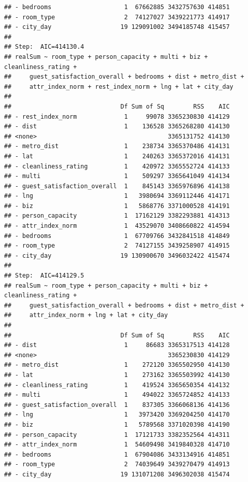\documentclass[
]{article}
\begin{document}
\begin{verbatim}
## - bedrooms                    1  67662885 3432757630 414851
## - room_type                   2  74127027 3439221773 414917
## - city_day                   19 129091002 3494185748 415457
## 
## Step:  AIC=414130.4
## realSum ~ room_type + person_capacity + multi + biz + cleanliness_rating + 
##     guest_satisfaction_overall + bedrooms + dist + metro_dist + 
##     attr_index_norm + rest_index_norm + lng + lat + city_day
## 
##                              Df Sum of Sq        RSS    AIC
## - rest_index_norm             1     99078 3365230830 414129
## - dist                        1    136528 3365268280 414130
## <none>                                    3365131752 414130
## - metro_dist                  1    238734 3365370486 414131
## - lat                         1    240263 3365372016 414131
## - cleanliness_rating          1    420972 3365552724 414133
## - multi                       1    509297 3365641049 414134
## - guest_satisfaction_overall  1    845143 3365976896 414138
## - lng                         1   3980694 3369112446 414171
## - biz                         1   5868776 3371000528 414191
## - person_capacity             1  17162129 3382293881 414313
## - attr_index_norm             1  43529070 3408660822 414594
## - bedrooms                    1  67709766 3432841518 414849
## - room_type                   2  74127155 3439258907 414915
## - city_day                   19 130900670 3496032422 415474
## 
## Step:  AIC=414129.5
## realSum ~ room_type + person_capacity + multi + biz + cleanliness_rating + 
##     guest_satisfaction_overall + bedrooms + dist + metro_dist + 
##     attr_index_norm + lng + lat + city_day
## 
##                              Df Sum of Sq        RSS    AIC
## - dist                        1     86683 3365317513 414128
## <none>                                    3365230830 414129
## - metro_dist                  1    272120 3365502950 414130
## - lat                         1    273162 3365503992 414130
## - cleanliness_rating          1    419524 3365650354 414132
## - multi                       1    494022 3365724852 414133
## - guest_satisfaction_overall  1    837305 3366068136 414136
## - lng                         1   3973420 3369204250 414170
## - biz                         1   5789568 3371020398 414190
## - person_capacity             1  17121733 3382352564 414311
## - attr_index_norm             1  54609498 3419840328 414710
## - bedrooms                    1  67904086 3433134916 414851
## - room_type                   2  74039649 3439270479 414913
## - city_day                   19 131071208 3496302038 415474

\end{verbatim}
\end{document}
